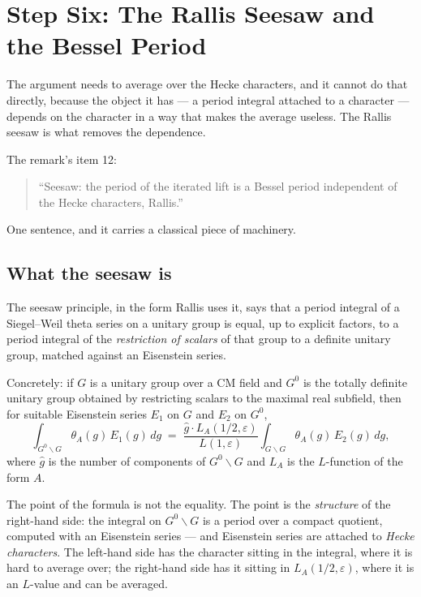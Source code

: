 
\chapter{Step Six: The Rallis Seesaw and the Bessel Period}
\label{ch:seesaw}

The argument needs to average over the Hecke characters, and it cannot do that
directly, because the object it has --- a period integral attached to a
character --- depends on the character in a way that makes the average
useless. The Rallis seesaw is what removes the dependence.

The remark's item 12:

\begin{quote}
\small
``Seesaw: the period of the iterated lift is a Bessel period independent of the
Hecke characters, Rallis.''
\end{quote}

One sentence, and it carries a classical piece of machinery.

\section{What the seesaw is}The seesaw principle, in the form Rallis uses it, says that a period integral
of a Siegel--Weil theta series on a unitary group is equal, up to explicit
factors, to a period integral of the \emph{restriction of scalars} of that
group to a definite unitary group, matched against an Eisenstein series.

Concretely: if $G$ is a unitary group over a CM field and $G^0$ is the
totally definite unitary group obtained by restricting scalars to the maximal
real subfield, then for suitable Eisenstein series $E_1$ on $G$ and $E_2$ on
$G^0$,
\begin{equation}
\int_{G^0\backslash G} \theta_A(g)\,E_1(g)\,dg
\;=\;
\frac{\hat g \cdot L_A(1/2,\varepsilon)}{L(1,\varepsilon)}\int_{G\backslash G} \theta_A(g)\,E_2(g)\,dg,
\label{eq:seesaw}
\end{equation}
where $\hat g$ is the number of components of $G^0\backslash G$ and $L_A$ is the
$L$-function of the form $A$.

The point of the formula is not the equality. The point is the \emph{structure}
of the right-hand side: the integral on $G^0\backslash G$ is a period over a
compact quotient, computed with an Eisenstein series --- and Eisenstein series
are attached to \emph{Hecke characters}. The left-hand side has the character
sitting in the integral, where it is hard to average over; the right-hand side
has it sitting in $L_A(1/2,\varepsilon)$, where it is an $L$-value and can be
averaged.

